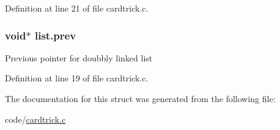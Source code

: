 Definition at line 21 of file cardtrick.c.

\hypertarget{structlist_a5632e373e65bcebe2f020d52e03c316b}{
\subsubsection[{prev}]{\setlength{\rightskip}{0pt plus 5cm}void$\ast$ {\bf list.prev}}}
\label{structlist_a5632e373e65bcebe2f020d52e03c316b}
Previous pointer for doubbly linked list 

Definition at line 19 of file cardtrick.c.



The documentation for this struct was generated from the following file:\begin{DoxyCompactItemize}
\item 
code/\hyperlink{cardtrick_8c}{cardtrick.c}\end{DoxyCompactItemize}
